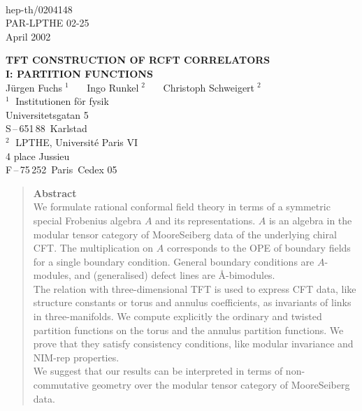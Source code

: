 \begin{flushright}  {~} \\[-12mm]
{\sf hep-th/0204148}\\[1mm]{\sf PAR-LPTHE 02-25}\\[1mm]
{\sf April 2002} \end{flushright}

\begin{center} \vskip 14mm
{\Large\bf TFT CONSTRUCTION OF RCFT CORRELATORS}\\[4mm]
{\Large\bf I: PARTITION FUNCTIONS}\\[20mm] 
{\large 
J\"urgen Fuchs$\;^1$ \ \ \ Ingo Runkel$\;^2$ \ \ \ Christoph Schweigert$\;^2$}
\\[8mm]
$^1\;$ Institutionen f\"or fysik~~~~{}\\
Universitetsgatan 5\\ S\,--\,651\,88\, Karlstad\\[5mm]
$^2\;$ LPTHE, Universit\'e Paris VI~~~{}\\
4 place Jussieu\\ F\,--\,75\,252\, Paris\, Cedex 05
\end{center}
\vskip 20mm

\begin{quote}{\bf Abstract}\\[1mm]
We formulate rational conformal field theory in terms of a symmetric 
special Frobenius algebra $A$ and its representations. $A$ is an algebra 
in the modular tensor category of Moore\hy Seiberg data of the underlying 
chiral CFT. The multiplication on $A$ corresponds to the OPE of boundary 
fields for a single boundary condition. General boundary conditions are 
$A$-modules, and (generalised) defect lines are \AA-bimodules.
\\
The relation with three-dimensional TFT is used to express CFT data, like
structure constants or torus and annulus coefficients, as invariants of 
links in three-manifolds. We compute explicitly the ordinary and twisted 
partition functions on the torus and the annulus partition functions. We  
prove that they satisfy consistency conditions, like modular invariance 
and NIM-rep properties.
\\
We suggest that our results can be interpreted in terms of non-commutative
geometry over the modular tensor category of Moore\hy Seiberg data.
\end{quote}
\vfill
\newpage


